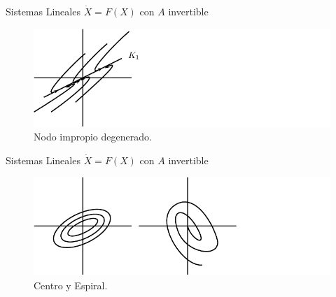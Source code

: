 \documentclass{beamer}
\newcommand{\R}{{\ensuremath{\mathbb{R}}}}
\begin{document}
\begin{frame}{Sistemas Lineales $\dot{X} = F(X)$ con $A$ invertible}
\begin{figure}[!ht] \centering
    \includegraphics[scale=1.0]{../figures/nodoimpropio.pdf}
\caption{Nodo impropio degenerado.}
\end{figure}
\end{frame}

\begin{frame}{Sistemas Lineales $\dot{X} = F(X)$ con $A$ invertible}
\begin{figure}[!ht] \centering
    \includegraphics[scale=1.0]{../figures/centroyespiral.pdf}
\caption{Centro y Espiral.}
\end{figure}
\end{frame}

%
%
%
\end{document}
